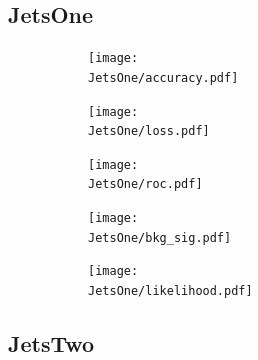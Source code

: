 \documentclass[../../main/main.tex]{subfiles}
\begin{document}
\subsection{JetsOne}
\label{sec:fillzero}


\begin{figure}[H]
  \centering
  \begin{subfigure}[t]{0.5\textwidth}
    \centering
    \texttt{[image: \\JetsOne/accuracy.pdf]}
    \caption{\captionAcc}
    \label{fig:JetsOne_acc}
  \end{subfigure}
  \vspace{0.01cm}
  \begin{subfigure}[t]{0.5\textwidth}
    \centering
    \texttt{[image: \\JetsOne/loss.pdf]}
    \caption{\captionLoss}
    \label{fig:JetsOne_loss}
  \end{subfigure}
  \begin{subfigure}[t]{0.5\textwidth}
    \centering
    \texttt{[image: \\JetsOne/roc.pdf]}
    \caption{\captionROC}
    \label{fig:JetsOne_roc}
  \end{subfigure}
  \caption{}
  \label{fig:JetsOne_1}  
\end{figure}

\begin{figure}[H]
  \centering
  \begin{subfigure}[t]{0.5\textwidth}
    \centering
    \texttt{[image: \\JetsOne/bkg\_sig.pdf]}
    \caption{\captionBkgSig}    
    \label{fig:JetsOne_bkg_sig}
  \end{subfigure}
  \vspace{0.01cm}
  \begin{subfigure}[t]{0.5\textwidth}
    \centering
    \texttt{[image: \\JetsOne/likelihood.pdf]}
    \caption{\captionLik}    
    \label{fig:JetsOne_likelihood}
  \end{subfigure}
  \caption{}
  \label{fig:JetsOne_Z}
\end{figure}

\subsection{JetsTwo}
\label{sec:fillzero}
\end{document}
